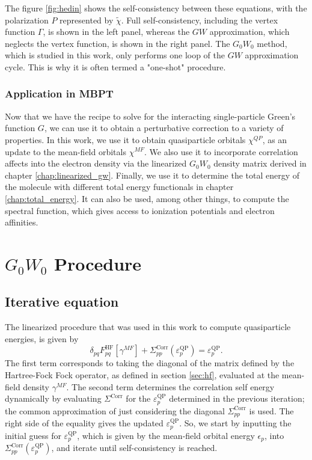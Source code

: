 \documentclass[12pt]{caltech_thesis}
\begin{document}
The figure \ref{fig:hedin} shows the self-consistency between these equations, with the polarization $P$ represented by $\tilde{\chi}$. Full self-consistency, including the vertex function $\Gamma$, is shown in the left panel, whereas the $GW$ approximation, which neglects the vertex function, is shown in the right panel. The $G_0W_0$ method, which is studied in this work, only performs one loop of the $GW$ approximation cycle. This is why it is often termed a "one-shot" procedure.
\subsection{Application in MBPT}
Now that we have the recipe to solve for the interacting single-particle Green's function $G$, we can use it to obtain a perturbative correction to a variety of properties.  In this work, we use it to obtain quasiparticle orbitals $\chi^{QP}$, as an update to the mean-field orbitals $\chi^{MF}$. We also use it to incorporate correlation affects into the electron density via the linearized $G_0W_0$ density matrix derived in chapter \ref{chap:linearized_gw}. Finally, we use it to determine the total energy of the molecule with different total energy functionals in chapter \ref{chap:total_energy}. It can also be used, among other things, to compute the spectral function, which gives access to ionization potentials and electron affinities. \autocite{noauthor_frontiers_nodate}






\chapter{$G_0W_0$ Procedure}
\section{Iterative equation}
The linearized procedure that was used in this work to compute quasiparticle energies, is given by \autocite{bruneval_assessment_2019}
\begin{equation}
    \delta_{pq}F_{pq}^{\mathrm{HF}}[\gamma^{MF}] + \Sigma_{pp}^{\mathrm{Corr}}(\varepsilon_{p}^{\mathrm{QP}}) = \varepsilon_{p}^{\mathrm{QP}}.
\label{eq: Iterative equation}
\end{equation}
The first term corresponds to taking the diagonal of the matrix defined by the Hartree-Fock Fock operator, as defined in section \ref{sec:hf}, evaluated at the mean-field density $\gamma^{MF}$.
  The second term determines the correlation self energy dynamically by evaluating $\Sigma^{\mathrm{Corr}}$
for the $\varepsilon_{p}^{\mathrm{QP}}$ determined in the previous iteration; the common approximation of just considering the diagonal $\Sigma_{pp}^{\mathrm{Corr}}$ is used.
The right side of the equality gives the updated $\varepsilon_{p}^{\mathrm{QP}}$. So, we start by inputting the initial guess for $\varepsilon_{p}^{\mathrm{QP}}$, which is given by the mean-field orbital energy $\epsilon_p$, into $\Sigma_{pp}^{\mathrm{Corr}}(\varepsilon_{p}^{\mathrm{QP}})$, and iterate until self-consistency is reached.
\end{document}
